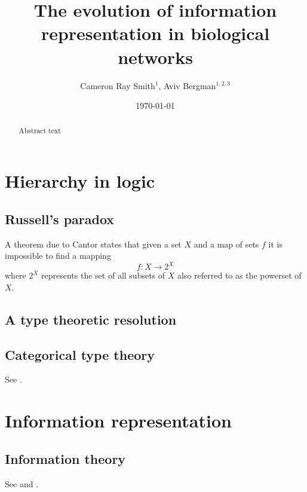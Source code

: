 \documentclass[aps,twocolumn]{revtex4}
\begin{document}
 

\title{\bf The evolution of information representation in biological networks}

\author{Cameron Ray Smith$^{1}$, Aviv Bergman$^{1,2,3}$}


\date{\today}
\begin{abstract}
Abstract text
\end{abstract}

\maketitle

\tableofcontents

\section{Hierarchy in logic}

\subsection{Russell's paradox}
A theorem due to Cantor states that given a set $X$ and a map of sets $f$ it is impossible to find a mapping $$ f: X \rightarrow 2^X $$ where $2^X$ represents the set of all subsets of $X$ also referred to as the powerset of $X$.

\subsection{A type theoretic resolution}

\subsection{Categorical type theory}
See \cite{Crole1994a}.

\section{Information representation}

\subsection{Information theory}
See \cite{Ellerman2008} and \cite{Cover2006}.
\end{document}
